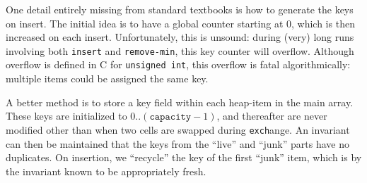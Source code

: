 One detail entirely missing from standard textbooks is how to generate the keys on insert.  The initial idea is to have a global counter starting at 0, which is then increased on each insert.  Unfortunately, this is unsound: during (very) long runs involving both \texttt{insert} and \texttt{remove-min}, this key counter will overflow.  Although overflow is defined in C for \texttt{unsigned int}, this overflow is fatal algorithmically: multiple items could be assigned the same key.

A better method is to store a key field within each heap-item in the main array.  These keys are initialized to $0..(\texttt{capacity}-1)$, and thereafter are never modified other than when two cells are swapped during \texttt{exch}ange.  An invariant can then be maintained that the keys from the ``live'' and ``junk'' parts have no duplicates.  On insertion, we ``recycle'' the key of the first ``junk'' item, which is by the invariant known to be appropriately fresh.

